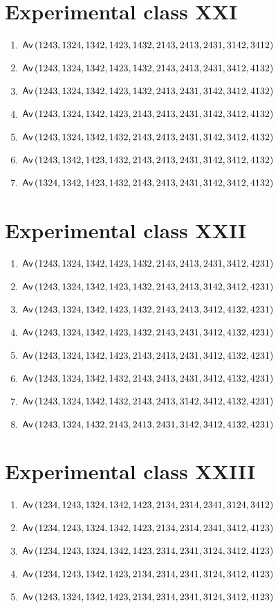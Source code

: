 \section{Experimental class XXI}
\begin{enumerate}
\item $\textsf{Av}\left(1243,1324,1342,1423,1432,2143,2413,2431,3142,3412\right)$
\item $\textsf{Av}\left(1243,1324,1342,1423,1432,2143,2413,2431,3412,4132\right)$
\item $\textsf{Av}\left(1243,1324,1342,1423,1432,2413,2431,3142,3412,4132\right)$
\item $\textsf{Av}\left(1243,1324,1342,1423,2143,2413,2431,3142,3412,4132\right)$
\item $\textsf{Av}\left(1243,1324,1342,1432,2143,2413,2431,3142,3412,4132\right)$
\item $\textsf{Av}\left(1243,1342,1423,1432,2143,2413,2431,3142,3412,4132\right)$
\item $\textsf{Av}\left(1324,1342,1423,1432,2143,2413,2431,3142,3412,4132\right)$
\end{enumerate}

\section{Experimental class XXII}
\begin{enumerate}
\item $\textsf{Av}\left(1243,1324,1342,1423,1432,2143,2413,2431,3412,4231\right)$
\item $\textsf{Av}\left(1243,1324,1342,1423,1432,2143,2413,3142,3412,4231\right)$
\item $\textsf{Av}\left(1243,1324,1342,1423,1432,2143,2413,3412,4132,4231\right)$
\item $\textsf{Av}\left(1243,1324,1342,1423,1432,2143,2431,3412,4132,4231\right)$
\item $\textsf{Av}\left(1243,1324,1342,1423,2143,2413,2431,3412,4132,4231\right)$
\item $\textsf{Av}\left(1243,1324,1342,1432,2143,2413,2431,3412,4132,4231\right)$
\item $\textsf{Av}\left(1243,1324,1342,1432,2143,2413,3142,3412,4132,4231\right)$
\item $\textsf{Av}\left(1243,1324,1432,2143,2413,2431,3142,3412,4132,4231\right)$
\end{enumerate}

\section{Experimental class XXIII}
\begin{enumerate}
\item $\textsf{Av}\left(1234,1243,1324,1342,1423,2134,2314,2341,3124,3412\right)$
\item $\textsf{Av}\left(1234,1243,1324,1342,1423,2134,2314,2341,3412,4123\right)$
\item $\textsf{Av}\left(1234,1243,1324,1342,1423,2314,2341,3124,3412,4123\right)$
\item $\textsf{Av}\left(1234,1243,1342,1423,2134,2314,2341,3124,3412,4123\right)$
\item $\textsf{Av}\left(1243,1324,1342,1423,2134,2314,2341,3124,3412,4123\right)$
\end{enumerate}

